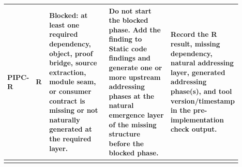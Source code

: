 \begin{longtable}{L{0.055\linewidth} L{0.065\linewidth} L{0.305\linewidth} L{0.345\linewidth} L{0.19\linewidth}}
\hline
\addlinespace[0.24em]
PIPC-R & R & Blocked: at least one required dependency, object, proof bridge, source extraction, module seam, or consumer contract is missing or not naturally generated at the required layer. & Do not start the blocked phase. Add the finding to Static code findings and generate one or more upstream addressing phases at the natural emergence layer of the missing structure before the blocked phase. & Record the R result, missing dependency, natural addressing layer, generated addressing phase(s), and tool version/\allowbreak{}timestamp in the pre-implementation check output.\\
\hline
\addlinespace[0.24em]
\end{longtable}
\normalsize
